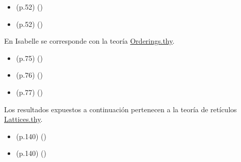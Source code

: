 \begin{isabellebody}
\begin{isamarkuptext}
\begin{itemize}
      \hfill ()
    \item (p.52)  
      \hfill ()
    \item (p.52)  
      \hfill ()
  \end{itemize}%
\end{isamarkuptext}\isamarkuptrue%
%
\isadelimdocument
%
\endisadelimdocument
%
\isatagdocument
%
\isamarkuptrue%
%
\endisatagdocument
{\isafolddocument}%
%
\isadelimdocument
%
\endisadelimdocument
%
\begin{isamarkuptext}%
En Isabelle se corresponde con la teoría 
\href{https://acortar.link/LxuXO}{Orderings.thy}.%
\end{isamarkuptext}\isamarkuptrue%
%
\begin{isamarkuptext}%
\begin{itemize}
    \item (p.75)  
      \hfill ()
    \item (p.76)  
      \hfill ()
    \item (p.77)  
      \hfill ()
  \end{itemize}%
\end{isamarkuptext}\isamarkuptrue%
%
\isadelimdocument
%
\endisadelimdocument
%
\isatagdocument
%
\isamarkuptrue%
%
\endisatagdocument
{\isafolddocument}%
%
\isadelimdocument
%
\endisadelimdocument
%
\begin{isamarkuptext}%
Los resultados expuestos a continuación pertenecen a la teoría de 
  retículos \href{https://acortar.link/ajRsg}{Lattices.thy}.%
\end{isamarkuptext}\isamarkuptrue%
%
\begin{isamarkuptext}%
\begin{itemize}
    \item (p.140)  
      \hfill ()
    \item (p.140)  
      \hfill ()

\end{itemize}
\end{isamarkuptext}
\end{isabellebody}
